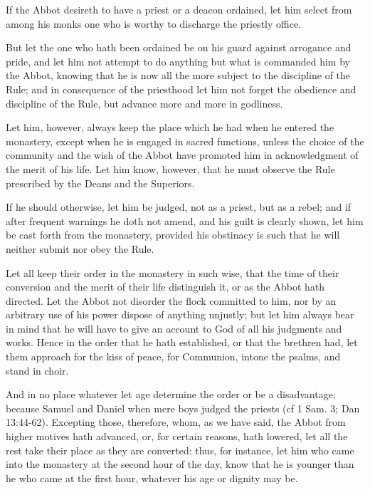 
If the Abbot desireth to have a priest or a deacon ordained, let him select from among his monks one who is worthy to discharge the priestly office.

But let the one who hath been ordained be on his guard against arrogance and pride, and let him not attempt to do anything but what is commanded him by the Abbot, knowing that he is now all the more subject to the discipline of the Rule; and in consequence of the priesthood let him not forget the obedience and discipline of the Rule, but advance more and more in godliness.

Let him, however, always keep the place which he had when he entered the monastery, except when he is engaged in sacred functions, unless the choice of the community and the wish of the Abbot have promoted him in acknowledgment of the merit of his life. Let him know, however, that he must observe the Rule prescribed by the Deans and the Superiors.

If he should otherwise, let him be judged, not as a priest, but as a rebel; and if after frequent warnings he doth not amend, and his guilt is clearly shown, let him be cast forth from the monastery, provided his obstinacy is such that he will neither submit nor obey the Rule.


Let all keep their order in the monastery in such wise, that the time of their conversion and the merit of their life distinguish it, or as the Abbot hath directed. Let the Abbot not disorder the flock committed to him, nor by an arbitrary use of his power dispose of anything unjustly; but let him always bear in mind that he will have to give an account to God of all his judgments and works. Hence in the order that he hath established, or that the brethren had, let them approach for the kiss of peace, for Communion, intone the psalms, and stand in choir.

And in no place whatever let age determine the order or be a disadvantage; because Samuel and Daniel when mere boys judged the priests (cf 1 Sam. 3; Dan 13:44-62). Excepting those, therefore, whom, as we have said, the Abbot from higher motives hath advanced, or, for certain reasons, hath lowered, let all the rest take their place as they are converted: thus, for instance, let him who came into the monastery at the second hour of the day, know that he is younger than he who came at the first hour, whatever his age or dignity may be.

